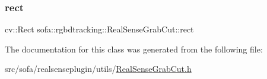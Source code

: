 \mbox{\label{classsofa_1_1rgbdtracking_1_1_real_sense_grab_cut_adc07cdbc1f27d1e1d1f189a722b6c99d}} 
\subsubsection{\texorpdfstring{rect}{rect}}
{\footnotesize\ttfamily cv\+::\+Rect sofa\+::rgbdtracking\+::\+Real\+Sense\+Grab\+Cut\+::rect}



The documentation for this class was generated from the following file\+:\begin{DoxyCompactItemize}
\item 
src/sofa/realsenseplugin/utils/\hyperlink{_real_sense_grab_cut_8h}{Real\+Sense\+Grab\+Cut.\+h}\end{DoxyCompactItemize}
